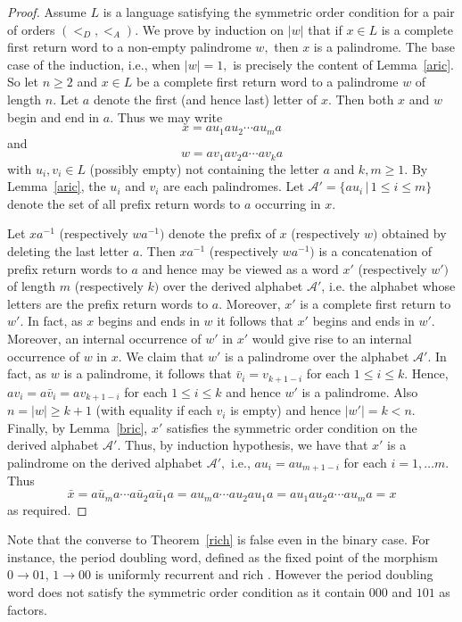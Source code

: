\documentclass[12pt,a4paper]{amsart}
\begin{document}
\begin{proof} Assume $L$ is a language satisfying the symmetric order condition for a pair of orders $(<_D, <_A).$ We prove by induction on $|w|$ that if $x\in L$ is a complete first return word to a non-empty palindrome $w,$ then $x$ is a palindrome. The base case of the induction, i.e., when $|w|=1,$ is precisely the content of Lemma~\ref{aric}.  So  let  $n\geq 2$ and  $x\in L$ be a complete first return word  to a palindrome $w$ of length $n.$ Let $a$ denote the first (and hence last) letter of $x.$ Then both $x$ and $w$ begin and end in $a.$ Thus we may write \[x=au_1au_2\cdots au_ma\] and \[w=av_1av_2a\cdots av_ka\] with $u_i,v_i \in L$ (possibly empty) not containing the letter $a$ and $k,m\geq 1.$ By Lemma~\ref{aric}, the $u_i$ and $v_i$  are each palindromes. Let $\mathcal A'=\{au_i\,|\, 1\leq i\leq m\}$ denote the set of all prefix  return words to $a$ occurring in $x.$  

Let $xa^{-1}$ (respectively $wa^{-1})$ denote the prefix of $x$ (respectively $w)$ obtained by deleting the last letter $a.$ Then $ xa^{-1}$ (respectively $wa^{-1})$ is a concatenation of prefix return words to $a$ and hence  may be viewed as a word $x'$ (respectively $w')$ of length $m$ (respectively $k)$ over the derived alphabet $\mathcal A'$, i.e. the alphabet whose letters are the prefix return words to $a$. Moreover, $x'$ is a complete first return to $w'.$ In fact, as $x$ begins and ends in $w$ it follows that $x'$ begins and ends in $w'.$ Moreover,  an internal occurrence of $w'$ in $x'$ would give rise to an internal occurrence of $w$ in $x.$ We claim that $w'$ is a palindrome over the alphabet $\mathcal A'.$ In fact, as $w$ is a palindrome,  it follows that $\bar v_i= v_{k+1-i}$ for 
each $1\leq i\leq k.$  Hence, $av_i=a\bar v_i=av_{k+1-i}$ for each $1\leq i\leq k$ and hence $w'$ is a palindrome. 
Also $n=|w|\geq k+1$ (with equality if each $v_i$ is empty) and hence $|w'|=k<n.$ Finally, by Lemma~\ref{bric},  $x'$ satisfies the symmetric order condition on the derived alphabet $\mathcal A'.$ Thus, by induction hypothesis, we have that $x'$ is a palindrome on the derived alphabet $\mathcal A',$ i.e., $au_i=au_{m+1-i}$ for each $i=1,\ldots m.$  Thus \[\bar x= a\bar u_ma \cdots a\bar u_2a\bar u_1a=au_ma\cdots au_2au_1a=au_1au_2a\cdots au_ma=x\] as required. 
\end{proof}

Note that  the converse to Theorem~\ref{rich} is false even in the binary case. For instance, the period doubling word, defined as the fixed point of the morphism $0\to  01$, $1 \to 00$ is uniformly recurrent and rich \cite{bal}.  However the period doubling word does not satisfy the symmetric order condition as it contain $000$ and $101$ as factors. \\
\end{document}
